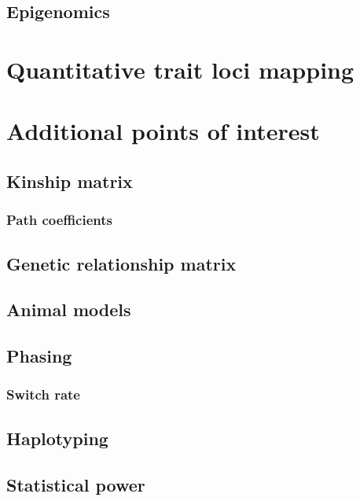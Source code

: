 \documentclass[]{book}
\theoremstyle{definition}
\theoremstyle{definition}
\theoremstyle{definition}
\theoremstyle{remark}
\begin{document}
\section{Epigenomics}\label{epigenomics}

\chapter{Quantitative trait loci
mapping}\label{quantitative-trait-loci-mapping}

\chapter{Additional points of
interest}\label{additional-points-of-interest}

\section{Kinship matrix}\label{kinship-matrix}

\subsection{Path coefficients}\label{path-coefficients}

\section{Genetic relationship matrix}\label{genetic-relationship-matrix}

\section{Animal models}\label{animal-models}

\section{Phasing}\label{phasing}

\subsection{Switch rate}\label{switch-rate}

\section{Haplotyping}\label{haplotyping}

\section{Statistical power}\label{statistical-power}
\end{document}
